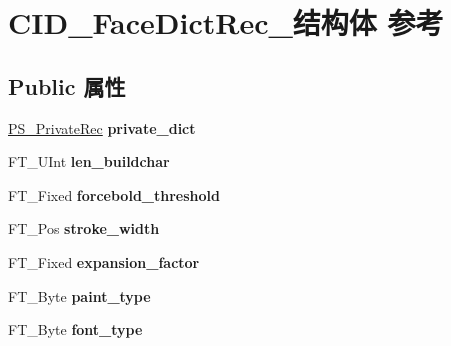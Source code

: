 \hypertarget{struct_c_i_d___face_dict_rec__}{}\section{C\+I\+D\+\_\+\+Face\+Dict\+Rec\+\_\+结构体 参考}
\label{struct_c_i_d___face_dict_rec__}
\subsection*{Public 属性}
\begin{DoxyCompactItemize}
\item 
\mbox{\label{struct_c_i_d___face_dict_rec___a6ccc25ba0592648bbb7a4a163fc7fdb0}} 
\hyperlink{struct_p_s___private_rec__}{P\+S\+\_\+\+Private\+Rec} {\bfseries private\+\_\+dict}
\item 
\mbox{\label{struct_c_i_d___face_dict_rec___aec468e2ef1159dd49d33ff3560e8d15b}} 
F\+T\+\_\+\+U\+Int {\bfseries len\+\_\+buildchar}
\item 
\mbox{\label{struct_c_i_d___face_dict_rec___a4db0975dbd1211cb43f4dfc36061b3cb}} 
F\+T\+\_\+\+Fixed {\bfseries forcebold\+\_\+threshold}
\item 
\mbox{\label{struct_c_i_d___face_dict_rec___a7da1ebfa4a184b696f789c27c07f23d1}} 
F\+T\+\_\+\+Pos {\bfseries stroke\+\_\+width}
\item 
\mbox{\label{struct_c_i_d___face_dict_rec___ae601bb5bc25e9a5f3da8e7c12fef6c92}} 
F\+T\+\_\+\+Fixed {\bfseries expansion\+\_\+factor}
\item 
\mbox{\label{struct_c_i_d___face_dict_rec___a77e70cc8a5eba8e6a0f6a3a3e2e8d50c}} 
F\+T\+\_\+\+Byte {\bfseries paint\+\_\+type}
\item 
\mbox{\label{struct_c_i_d___face_dict_rec___af26e3e5ca3d912c2512e85257b635837}} 
F\+T\+\_\+\+Byte {\bfseries font\+\_\+type}
\item 
\mbox{\label{struct_c_i_d___face_dict_rec___aa418f6ce40b7574b6234e0ab48377e4b}} 

\end{DoxyCompactItemize}
